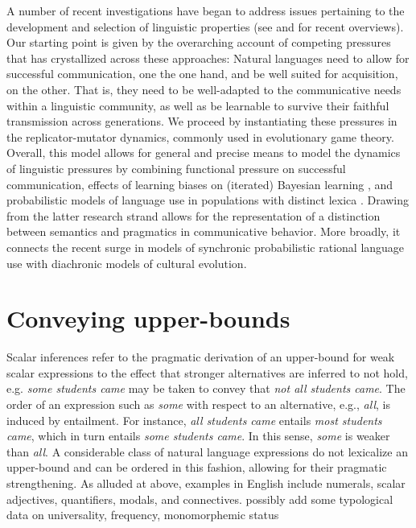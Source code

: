 \documentclass[a4paper]{article}
\newcommand{\hl}[1]{\textcolor[rgb]{.8,.33,.0}{#1}}%
\begin{document}
A number of recent investigations have began to address issues pertaining to the development and selection of linguistic properties (see \citealt{steels:2015} and \citealt{tamariz+kirby:2016} for recent overviews). Our starting point is given by the overarching account of competing pressures that has crystallized across these approaches: Natural languages need to allow for successful communication, one the one hand, and be well suited for acquisition, on the other. That is, they need to be well-adapted to the communicative needs within a linguistic community, as well as be learnable to survive their faithful transmission across generations. We proceed by instantiating these pressures in the replicator-mutator dynamics, commonly used in evolutionary game theory. Overall, this model allows for general and precise means to model the dynamics of linguistic pressures by combining functional pressure on successful communication, effects of learning biases on (iterated) Bayesian learning \citep{griffiths+kalish:2007}, and  probabilistic models of language use in populations with distinct lexica \citep{frank+goodman:2012,franke+jaeger:2014, bergen+etal:2016}. Drawing from the latter research strand allows for the representation of a distinction between semantics and pragmatics in communicative behavior. More broadly, it connects the recent surge in models of synchronic probabilistic rational language use with diachronic models of cultural evolution.


\section{Conveying upper-bounds}
Scalar inferences refer to the pragmatic derivation of an upper-bound for weak scalar expressions to the effect that stronger alternatives are inferred to not hold, e.g. {\em some students came} may be taken to convey that {\em not all students came}. The order of an expression such as {\em some} with respect to an alternative, e.g., {\em all}, is induced by entailment. For instance, {\em all students came} entails {\em most students came}, which in turn entails {\em some students came}. In this sense, {\em some} is weaker than {\em all}. A considerable class of natural language expressions do not lexicalize an upper-bound and can be ordered in this fashion, allowing for their pragmatic strengthening. As alluded at above, examples in English include numerals, scalar adjectives, quantifiers, modals, and connectives. \hl{possibly add some typological data on universality, frequency, monomorphemic status}
\end{document}
